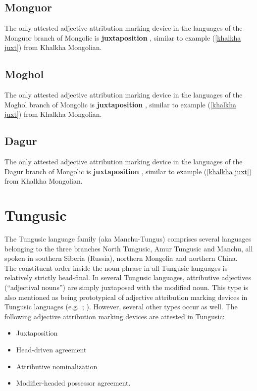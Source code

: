 \subsection{Monguor}
The only attested adjective attribution marking device in the languages of the Monguor branch of Mongolic is \textbf{juxtaposition} \citep{slater2003}, similar to example (\ref{khalkha juxt}) from Khalkha Mongolian.

\subsection{Moghol}
The only attested adjective attribution marking device in the languages of the Moghol branch of Mongolic is \textbf{juxtaposition} \citep{weiers2003}, similar to example (\ref{khalkha juxt}) from Khalkha Mongolian.

\subsection{Dagur}
The only attested adjective attribution marking device in the languages of the Dagur branch of Mongolic is \textbf{juxtaposition} \citep{tsumagari2003}, similar to example (\ref{khalkha juxt}) from Khalkha Mongolian.

\section{Tungusic} \label{tungusic synchr}
The Tungusic language family (aka Manchu-Tungus) comprises several languages belonging to the three branches North Tungusic, Amur Tungusic and Manchu, all spoken in southern Siberia (Russia), northern Mongolia and northern China.\\

\noindent The constituent order inside the noun phrase in all Tungusic languages is relatively strictly head-final. In several Tungusic languages, attributive adjectives (“adjectival nouns”) are simply juxtaposed with the modified noun. This type is also mentioned as being prototypical of adjective attribution marking devices in Tungusic languages (e.g.~\citealt{sunik1968a}; \citealt[133]{kormusin2005}). However, several other types occur as well. The following adjective attribution marking devices are attested in Tungusic:
\begin{itemize}
\item Juxtaposition
\item Head-driven agreement
\item Attributive nominalization
\item Modifier-headed possessor agreement.
\end{itemize}


